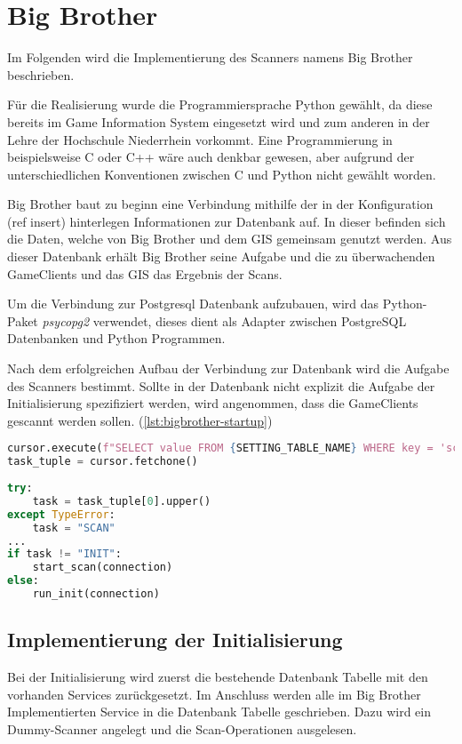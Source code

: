 \section{Big Brother}

Im Folgenden wird die Implementierung des Scanners namens Big Brother beschrieben.

Für die Realisierung wurde die Programmiersprache Python gewählt, da diese bereits im Game Information System eingesetzt wird und zum anderen in der Lehre der Hochschule Niederrhein vorkommt. Eine Programmierung in beispielsweise C oder C++ wäre auch denkbar gewesen, aber aufgrund der unterschiedlichen Konventionen zwischen C und Python nicht gewählt worden.

Big Brother baut zu beginn eine Verbindung mithilfe der in der Konfiguration (ref insert) hinterlegen Informationen zur Datenbank auf. In dieser befinden sich die Daten, welche von Big Brother und dem GIS gemeinsam genutzt werden. Aus dieser Datenbank erhält Big Brother seine Aufgabe und die zu überwachenden GameClients und das GIS das Ergebnis der Scans.

Um die Verbindung zur Postgresql Datenbank aufzubauen, wird das Python-Paket \textit{psycopg2} verwendet, dieses dient als Adapter zwischen PostgreSQL Datenbanken und Python Programmen. 

Nach dem erfolgreichen Aufbau der Verbindung zur Datenbank wird die Aufgabe des Scanners bestimmt. Sollte in der Datenbank nicht explizit die Aufgabe der Initialisierung spezifiziert werden, wird angenommen, dass die GameClients gescannt werden sollen. (\ref{lst:bigbrother-startup})

\begin{lstlisting}[language=Python, frame=single, caption={Aufgabe des Scanners}, captionpos=b, label={lst:bigbrother-startup}]
cursor.execute(f"SELECT value FROM {SETTING_TABLE_NAME} WHERE key = 'scanner.task'")
task_tuple = cursor.fetchone()
	
try:
	task = task_tuple[0].upper()
except TypeError:
	task = "SCAN"
...
if task != "INIT":
	start_scan(connection)
else:
	run_init(connection)	
\end{lstlisting}


\subsection{Implementierung der Initialisierung}

Bei der Initialisierung wird zuerst die bestehende Datenbank Tabelle mit den vorhanden Services zurückgesetzt.
Im Anschluss werden alle im Big Brother Implementierten Service in die Datenbank Tabelle geschrieben. Dazu wird ein Dummy-Scanner angelegt und die Scan-Operationen ausgelesen.

